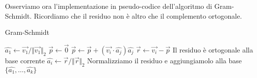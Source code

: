 \documentclass{article}
\begin{document}
            Osserviamo ora l'implementazione in pseudo-codice dell'algoritmo di Gram-Schmidt. Ricordiamo che il residuo non è altro che 
            il complemento ortogonale.
            \begin{algorithm}
                \caption{Gram-Schmidt}
                \label{Gram-Schimdt}
                \begin{algorithmic} %
                        \State $\hat{a_1} \gets \vec{v_1}/\Vert \vec{v_1} \Vert_2$ 
                            \State $\vec{p} \gets \vec{0}$
                             
                                \State $\vec{p} \gets \vec{p} + (\vec{v_i} \cdot \hat{a_j})\hat{a_j}$ 
                            \EndFor
                            \State $\vec{r} \gets \vec{v_i} - \vec{p}$ \Comment Il residuo è ortogonale alla base corrente
                            \State $\hat{a_i} \gets \vec{r}/\Vert \vec{r} \Vert_2$ \Comment Normalizziamo il residuo e aggiungiamolo alla base
                        \EndFor
                        \State \Return $\{ \hat{a_1}, \dots, \hat{a_k}\}$
                    \EndFunction
                \end{algorithmic}
            \end{algorithm}
\end{document}
